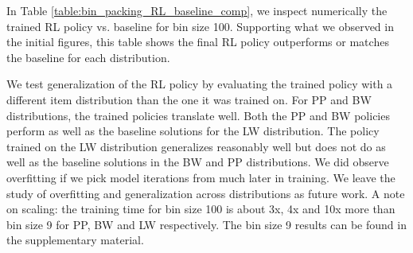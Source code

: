 \documentclass[letterpaper]{article} %
\begin{document}

In Table \ref{table:bin_packing_RL_baseline_comp}, we inspect numerically the trained RL policy vs. baseline for bin size 100.  %
Supporting what we observed in the initial figures, this table shows the final RL policy outperforms or matches the baseline for each distribution.

We test generalization of the RL policy by evaluating the trained policy with a different item distribution than the one it was trained on. For PP and BW distributions, the trained policies translate well. Both the PP and BW policies perform as well as the baseline solutions for the LW distribution. The policy trained on the LW distribution generalizes reasonably well but does not do as well as the baseline solutions in the BW and PP distributions. We did observe overfitting if we pick model iterations from much later in training. We leave the study of overfitting and generalization across distributions as future work. A note on scaling: the training time for bin size 100 is about 3x, 4x and 10x more than bin size 9 for PP, BW and LW respectively. The bin size 9 results can be found in the supplementary material.
\end{document}
